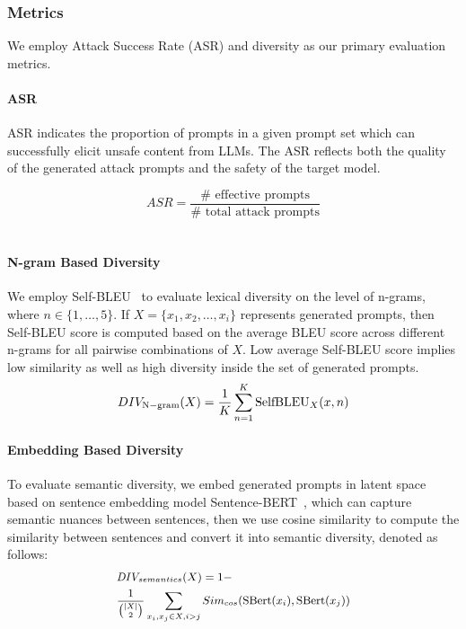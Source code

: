 \subsubsection{Metrics}
We employ Attack Success Rate (ASR) and diversity as our primary evaluation metrics. \\
\paragraph{ASR} ASR indicates the proportion of prompts in a given prompt set which can successfully elicit unsafe content from LLMs. The ASR reflects both the quality of the generated attack prompts and the safety of the target model. 

\[
\textit{ASR}=\frac{\#\text{ effective prompts}}{\#\text{ total attack prompts}}
\]
\
\paragraph{N-gram Based Diversity} We employ Self-BLEU~\cite{DBLP:journals/corr/abs-1802-01886} to evaluate lexical diversity on the level of n-grams, where $n \in \{1, \dots, 5\}$. If $X = \{x_1, x_2,\dots, x_i\}$ represents generated prompts, then Self-BLEU score is computed based on the average BLEU score across different n-grams for all pairwise combinations of $X$. Low average Self-BLEU score implies low similarity as well as high diversity inside the set of generated prompts.
\begin{equation}
\small
DIV_{\mathrm{N-gram}}(X)=\frac1{K}\sum_{n=1}^K{\rm SelfBLEU}_{X}(x,n)
\end{equation}

\paragraph{Embedding Based Diversity} To evaluate semantic diversity, we embed generated prompts in latent space based on sentence embedding model Sentence-BERT~\cite{DBLP:conf/emnlp/ReimersG19}, which can capture semantic nuances between sentences, then we use cosine similarity to compute the similarity between sentences and convert it into semantic diversity, denoted as follows:
\begin{equation}
\small
\begin{split}
& \textit{DIV}_{semantics}(X) = 1 - \\ 
& \frac{1}{\binom{|X|}{2}} 
\sum_{x_i,x_j\in{X},i>j} Sim_{cos}(\text{SBert}(x_i), \text{SBert}(x_j))
\end{split}
\end{equation}

